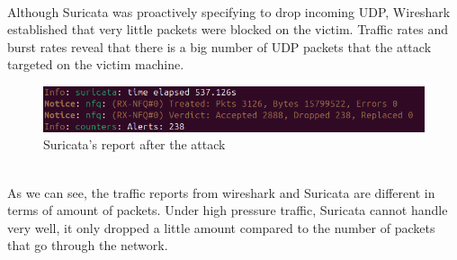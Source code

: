 \\
Although Suricata was proactively specifying to drop incoming UDP, Wireshark established that very little packets were blocked on the victim. Traffic rates and burst rates reveal that there is a big number of UDP packets that the attack targeted on the victim machine.
\\
\begin{figure}[!htb]
    \centering
    \includegraphics[width=0.8\linewidth]{thesis/report2.png}
    \caption{Suricata's report after the attack}
    \label{fig:enter-label}
\end{figure}
\\
As we can see, the traffic reports from wireshark and Suricata are different in terms of amount of packets. Under high pressure traffic, Suricata cannot handle very well, it only dropped a little amount compared to the number of packets that go through the network.
